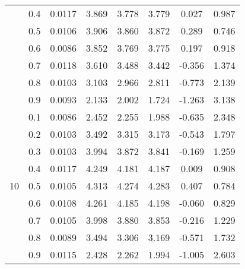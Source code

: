 \documentclass[11pt,a4paper]{report}
\begin{document}
\begin{longtable}{ | c | c || c | c | c | c | c | c | }
 & 0.4 & 0.0117 & 3.869 & 3.778 & 3.779 & 0.027 & 0.987 \\
 & 0.5 & 0.0106 & 3.906 & 3.860 & 3.872 & 0.289 & 0.746 \\
 & 0.6 & 0.0086 & 3.852 & 3.769 & 3.775 & 0.197 & 0.918 \\
 & 0.7 & 0.0118 & 3.610 & 3.488 & 3.442 & -0.356 & 1.374 \\
 & 0.8 & 0.0103 & 3.103 & 2.966 & 2.811 & -0.773 & 2.139 \\
 & 0.9 & 0.0093 & 2.133 & 2.002 & 1.724 & -1.263 & 3.138 \\
 \hline
\multirow{9}{*}{10} & 0.1 & 0.0086 & 2.452 & 2.255 & 1.988 & -0.635 & 2.348 \\
 & 0.2 & 0.0103 & 3.492 & 3.315 & 3.173 & -0.543 & 1.797 \\
 & 0.3 & 0.0103 & 3.994 & 3.872 & 3.841 & -0.169 & 1.259 \\
 & 0.4 & 0.0117 & 4.249 & 4.181 & 4.187 & 0.009 & 0.908 \\
 & 0.5 & 0.0105 & 4.313 & 4.274 & 4.283 & 0.407 & 0.784 \\
 & 0.6 & 0.0108 & 4.261 & 4.185 & 4.198 & -0.060 & 0.829 \\
 & 0.7 & 0.0105 & 3.998 & 3.880 & 3.853 & -0.216 & 1.229 \\
 & 0.8 & 0.0089 & 3.494 & 3.306 & 3.169 & -0.571 & 1.732 \\
 & 0.9 & 0.0115 & 2.428 & 2.262 & 1.994 & -1.005 & 2.603 \\
 \hline
\hline
\end{longtable}
\end{document}

